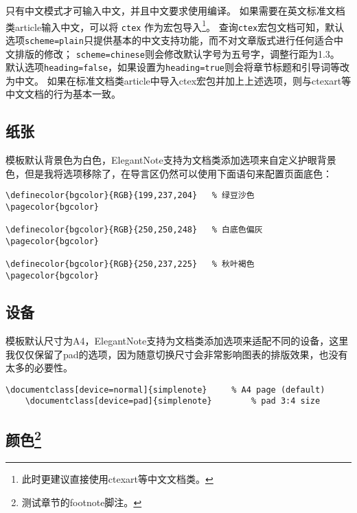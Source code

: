 \documentclass[cnfont=NotoCJK]{../simplenote}
\begin{document}
\begin{note}
    只有中文模式才可输入中文，并且中文要求使用编译。
    如果需要在英文标准文档类article输入中文，可以将 \lstinline{ctex} 作为宏包导入\footnote{此时更建议直接使用ctexart等中文文档类。}。
    查询\lstinline{ctex}宏包文档可知，默认选项\lstinline{scheme=plain}只提供基本的中文支持功能，而不对文章版式进行任何适合中文排版的修改；
    \lstinline{scheme=chinese}则会修改默认字号为五号字，调整行距为1.3。
    默认选项\lstinline{heading=false}，如果设置为\lstinline{heading=true}则会将章节标题和引导词等改为中文。
    如果在标准文档类article中导入ctex宏包并加上上述选项，则与ctexart等中文文档的行为基本一致。
\end{note}


\subsection{纸张}

模板默认背景色为白色，ElegantNote支持为文档类添加选项来自定义护眼背景色，但是我将选项移除了，在导言区仍然可以使用下面语句来配置页面底色：

\begin{lstlisting}[frame=single]
\definecolor{bgcolor}{RGB}{199,237,204}   % 绿豆沙色
\pagecolor{bgcolor}

\definecolor{bgcolor}{RGB}{250,250,248}   % 白底色偏灰
\pagecolor{bgcolor}

\definecolor{bgcolor}{RGB}{250,237,225}   % 秋叶褐色
\pagecolor{bgcolor}
\end{lstlisting}



\subsection{设备}

模板默认尺寸为A4，ElegantNote支持为文档类添加选项来适配不同的设备，这里我仅仅保留了pad的选项，因为随意切换尺寸会非常影响图表的排版效果，也没有太多的必要性。

\begin{lstlisting}[frame=single]
    \documentclass[device=normal]{simplenote}     % A4 page (default)
    \documentclass[device=pad]{simplenote}        % pad 3:4 size
\end{lstlisting}


\subsection[颜色]{颜色\footnote{测试章节的footnote脚注。}}
\end{document}
